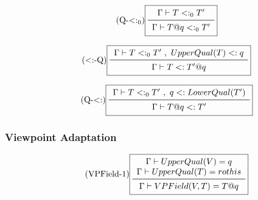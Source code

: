\vspace{0.4cm}

\begin{equation*}\tag{\mbox{Q-$<:_0$}}\label{equ-q-lt0}
\boxed{
\begin{array}{c}
\Gamma \vdash T <:_0 T' \\
\midrule
\Gamma \vdash T @ q <:_0 T' \\
\end{array}
}
\end{equation*}

\vspace{0.4cm}

\begin{equation*}\tag{\mbox{$<:$-Q}}\label{equ-lt-q}
\boxed{
\begin{array}{c}
\Gamma \vdash T <:_0 T'\ ,\ UpperQual(T) <: q \\
\midrule
\Gamma \vdash T <: T' @ q \\
\end{array}
}
\end{equation*}

\vspace{0.4cm}

\begin{equation*}\tag{\mbox{Q-$<:$}}\label{equ-q-lt}
\boxed{
\begin{array}{c}
\Gamma \vdash T <:_0 T'\ ,\ q <: LowerQual(T') \\
\midrule
\Gamma \vdash T @ q <: T' \\
\end{array}
}
\end{equation*}

\vspace{0.4cm}



\newpage

\subsubsection{Viewpoint Adaptation}

\begin{equation*}\tag{VPField-1}\label{equ-vpfield-1}
\boxed{
\begin{array}{c}
\Gamma \vdash UpperQual(V) = q \\
\Gamma \vdash UpperQual(T) = rothis \\
\midrule
\Gamma \vdash VPField(V,T) = T @ q \\
\end{array}
}
\end{equation*}

